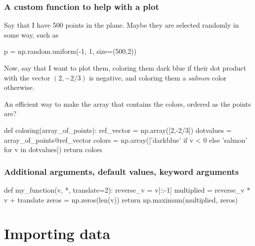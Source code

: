 \documentclass{beamer}
\newenvironment{codeblock}
    {\hfill\begin{beamerboxesrounded}[lower=codecol, width=0.8\textwidth]
    \medskip

    }
    { 
    \end{beamerboxesrounded}\hfill
    }
\theoremstyle{example}
\begin{document}
\begin{frame}[fragile]
\frametitle{A custom function to help with a plot}
Say that I have 500 points in the plane. Maybe they are selected randomly in some way, such as 

\begin{codeblock}

\begin{python}[numbers=none]
p = np.random.uniform(-1, 1, size=(500,2))
\end{python}

\end{codeblock}

Now, say that I want to plot them, coloring them dark blue if their dot product with the vector $(2,-2/3)$ is negative, and coloring them a \emph{salmon} color otherwise.

An efficient way to make the array that contains the colors, ordered as the points are?

\begin{codeblock}

\begin{python}
def coloring(array_of_points):
    ref_vector = np.array([2,-2/3])
    dotvalues = array_of_points@ref_vector
    colors = np.array(['darkblue' if v < 0 else 'salmon' for v in dotvalues])
    return colors
\end{python}

\end{codeblock}
\end{frame}

\begin{frame}[fragile]
\frametitle{Additional arguments, default values, keyword arguments}


\begin{codeblock}

\begin{python}
def my_function(v, *, translate=2):
    reverse_v = v[::-1]
    multiplied = reverse_v * v + translate
    zeros = np.zeros(len(v))
    return np.maximum(multiplied, zeros)
\end{python}

\end{codeblock}

\end{frame}

\section{Importing data}
\end{document}
